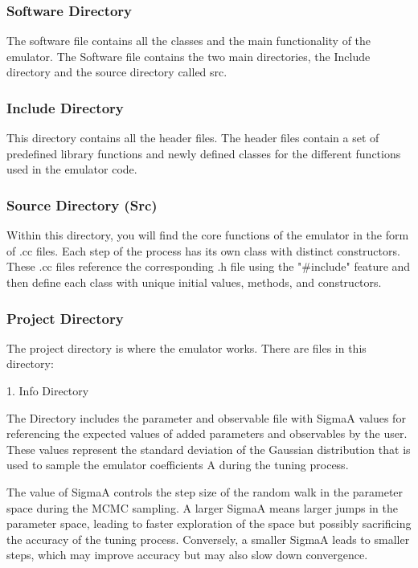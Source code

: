 \documentclass[12pt]{article}
\numberwithin{equation}{section}
\numberwithin{figure}{section}
\begin{document}
\subsubsection{Software Directory}

The software file contains all the classes and the main functionality of the emulator. The Software file contains the two main directories, the Include directory and the source directory called src.

\subsubsection{Include Directory}

This directory contains all the header files. The header files contain a set of predefined library functions and newly defined classes for the different functions used in the emulator code. 

\subsubsection{Source Directory (Src)}

Within this directory, you will find the core functions of the emulator in the form of .cc files. Each step of the process has its own class with distinct constructors. These .cc files reference the corresponding .h file using the "\#include" feature and then define each class with unique initial values, methods, and constructors. 


\subsubsection{Project Directory}

The project directory is where the emulator works. There are files in this directory: 

1. Info Directory 

The Directory includes the parameter and observable file with SigmaA values for referencing the expected values of added parameters and observables by the user. These values represent the standard deviation of the Gaussian distribution that is used to sample the emulator coefficients A during the tuning process.

The value of SigmaA controls the step size of the random walk in the parameter space during the MCMC sampling. A larger SigmaA means larger jumps in the parameter space, leading to faster exploration of the space but possibly sacrificing the accuracy of the tuning process. Conversely, a smaller SigmaA leads to smaller steps, which may improve accuracy but may also slow down convergence.
\end{document}
